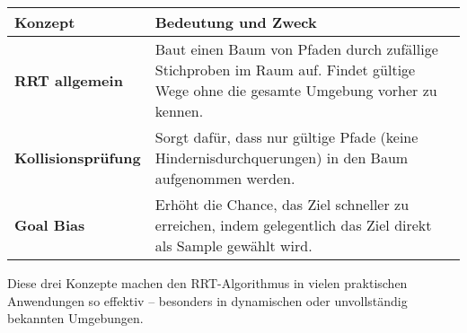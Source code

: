 \documentclass[12pt]{article}
\begin{document}
\begin{table}[H]
\centering
\renewcommand{\arraystretch}{1.2}
\begin{tabular}{|l|p{10cm}|}
\hline
\textbf{Konzept} & \textbf{Bedeutung und Zweck} \\
\hline
\textbf{RRT allgemein} & Baut einen Baum von Pfaden durch zufällige Stichproben im Raum auf. Findet gültige Wege ohne die gesamte Umgebung vorher zu kennen. \\
\hline
\textbf{Kollisionsprüfung} & Sorgt dafür, dass nur gültige Pfade (keine Hindernisdurchquerungen) in den Baum aufgenommen werden. \\
\hline
\textbf{Goal Bias} & Erhöht die Chance, das Ziel schneller zu erreichen, indem gelegentlich das Ziel direkt als Sample gewählt wird. \\
\hline
\end{tabular}
\end{table}

\vspace{1em}
Diese drei Konzepte machen den RRT-Algorithmus in vielen praktischen Anwendungen so effektiv – besonders in dynamischen oder unvollständig bekannten Umgebungen.
\end{document}

